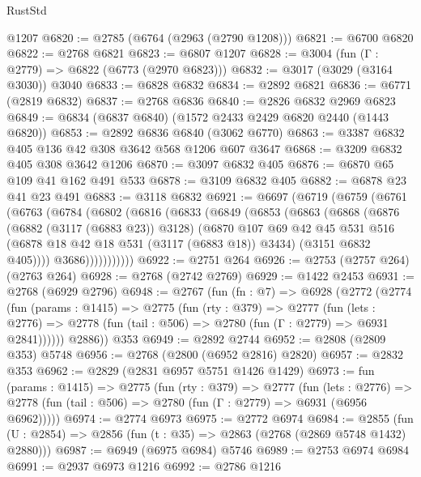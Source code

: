 \begin{lexlean}{RustStd}
\begin{coremodule}
    @1207
@6820 := @2785 (@6764 (@2963 (@2790 @1208)))
@6821 := @6700 @6820
@6822 := @2768 @6821
@6823 := @6807 @1207
@6828 := @3004 (fun (Γ : @2779) => @6822 (@6773 (@2970 @6823)))
@6832 := @3017 (@3029 (@3164 @3030)) @3040
@6833 := @6828 @6832
@6834 := @2892 @6821
@6836 := @6771 (@2819 @6832)
@6837 := @2768 @6836
@6840 := @2826 @6832 @2969 @6823
@6849 := @6834 (@6837 @6840) (@1572 @2433 @2429 @6820 @2440 (@1443 @6820))
@6853 := @2892 @6836 @6840 (@3062 @6770)
@6863 := @3387 @6832 @405 @136 @42 @308 @3642 @568 @1206 @607 @3647
@6868 := @3209 @6832 @405 @308 @3642 @1206
@6870 := @3097 @6832 @405
@6876 := @6870 @65 @109 @41 @162 @491 @533
@6878 := @3109 @6832 @405
@6882 := @6878 @23 @41 @23 @491
@6883 := @3118 @6832
@6921 := @6697
    (@6719
      (@6759
        (@6761
          (@6763
            (@6784
              (@6802
                (@6816
                  (@6833
                    (@6849
                      (@6853
                        (@6863
                          (@6868
                            (@6876
                              (@6882 (@3117 (@6883 @23)) @3128)
                              (@6870
                                @107
                                @69
                                @42
                                @45
                                @531
                                @516
                                (@6878 @18 @42 @18 @531 (@3117 (@6883 @18)) @3434)
                                (@3151 @6832 @405))))
                          @3686)))))))))))
@6922 := @2751 @264
@6926 := @2753 (@2757 @264) (@2763 @264)
@6928 := @2768 (@2742 @2769)
@6929 := @1422 @2453
@6931 := @2768 (@6929 @2796)
@6948 := @2767
    (fun (fn : @7) =>
    @6928
      (@2772
        (@2774
          (fun (params : @1415) =>
          @2775
            (fun (rty : @379) =>
            @2777
              (fun (lets : @2776) =>
              @2778 (fun (tail : @506) => @2780 (fun (Γ : @2779) => @6931 @2841))))))
        @2886))
    @353
@6949 := @2892 @2744
@6952 := @2808 (@2809 @353) @5748
@6956 := @2768 (@2800 (@6952 @2816) @2820)
@6957 := @2832 @353
@6962 := @2829 (@2831 @6957 @5751 @1426 @1429)
@6973 := fun (params : @1415) =>
  @2775
    (fun (rty : @379) =>
    @2777
      (fun (lets : @2776) =>
      @2778 (fun (tail : @506) => @2780 (fun (Γ : @2779) => @6931 (@6956 @6962)))))
@6974 := @2774 @6973
@6975 := @2772 @6974
@6984 := @2855 (fun (U : @2854) => @2856 (fun (t : @35) => @2863 (@2768 (@2869 @5748 @1432) @2880)))
@6987 := @6949 (@6975 @6984) @5746
@6989 := @2753 @6974 @6984
@6991 := @2937 @6973 @1216
@6992 := @2786 @1216

\end{coremodule}
\end{lexlean}
